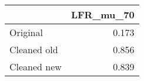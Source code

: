 \begin{tabular}{lr}
\toprule
{} & LFR_mu_70 \\
\midrule
Original    &     0.173 \\
Cleaned old &     0.856 \\
Cleaned new &     0.839 \\
\bottomrule
\end{tabular}
